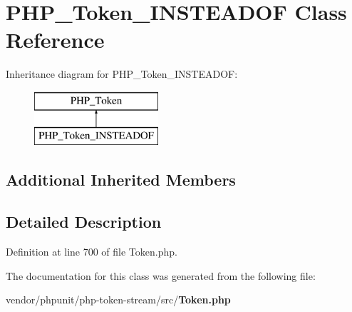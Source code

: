 \section{P\+H\+P\+\_\+\+Token\+\_\+\+I\+N\+S\+T\+E\+A\+D\+O\+F Class Reference}
\label{class_p_h_p___token___i_n_s_t_e_a_d_o_f}
Inheritance diagram for P\+H\+P\+\_\+\+Token\+\_\+\+I\+N\+S\+T\+E\+A\+D\+O\+F\+:\begin{figure}[H]
\begin{center}
\leavevmode
\includegraphics[height=2.000000cm]{class_p_h_p___token___i_n_s_t_e_a_d_o_f}
\end{center}
\end{figure}
\subsection*{Additional Inherited Members}


\subsection{Detailed Description}


Definition at line 700 of file Token.\+php.



The documentation for this class was generated from the following file\+:\begin{DoxyCompactItemize}
\item 
vendor/phpunit/php-\/token-\/stream/src/{\bf Token.\+php}\end{DoxyCompactItemize}

